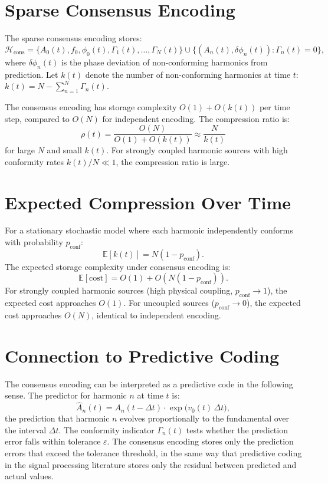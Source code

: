 \section{Sparse Consensus Encoding}
\label{app-c:consensus}

The sparse consensus encoding stores:
\[
  \mathcal{H}_{\mathrm{cons}}
  = \{A_0(t), f_0, \phi_0(t), \Gamma_1(t), \ldots, \Gamma_N(t)\}
  \cup \{(A_n(t), \delta\phi_n(t)) : \Gamma_n(t) = 0\},
\]
where $\delta\phi_n(t)$ is the phase deviation of
non-conforming harmonics from prediction. Let $k(t)$
denote the number of non-conforming harmonics at time
$t$: $k(t) = N - \sum_{n=1}^N \Gamma_n(t)$.

\begin{theorem}
\label{thm:compression}
The consensus encoding has storage complexity $O(1) + O(k(t))$
per time step, compared to $O(N)$ for independent
encoding. The compression ratio is:
\[
  \rho(t) = \frac{O(N)}{O(1) + O(k(t))} \approx \frac{N}{k(t)}
\]
for large $N$ and small $k(t)$. For strongly coupled
harmonic sources with high conformity rates $k(t)/N \ll 1$,
the compression ratio is large.
\end{theorem}

\section{Expected Compression Over Time}
\label{app-c:expected}

For a stationary stochastic model where each harmonic
independently conforms with probability $p_{\mathrm{conf}}$:
\[
  \mathbb{E}[k(t)] = N(1 - p_{\mathrm{conf}}).
\]
The expected storage complexity under consensus encoding is:
\[
  \mathbb{E}[\text{cost}] = O(1) + O(N(1 - p_{\mathrm{conf}})).
\]
For strongly coupled harmonic sources (high physical
coupling, $p_{\mathrm{conf}} \to 1$), the expected
cost approaches $O(1)$. For uncoupled sources
($p_{\mathrm{conf}} \to 0$), the expected cost approaches
$O(N)$, identical to independent encoding.

\section{Connection to Predictive Coding}
\label{app-c:predictive-coding}

The consensus encoding can be interpreted as a predictive
code in the following sense. The predictor for harmonic
$n$ at time $t$ is:
\[
  \hat{A}_n(t) = A_n(t - \Delta t) \cdot
  \exp\!\bigl(v_0(t)\,\Delta t\bigr),
\]
the prediction that harmonic $n$ evolves proportionally
to the fundamental over the interval $\Delta t$.
The conformity indicator $\Gamma_n(t)$ tests whether
the prediction error falls within tolerance $\varepsilon$.
The consensus encoding stores only the prediction errors
that exceed the tolerance threshold, in the same way
that predictive coding in the signal processing literature
stores only the residual between predicted and actual values.


